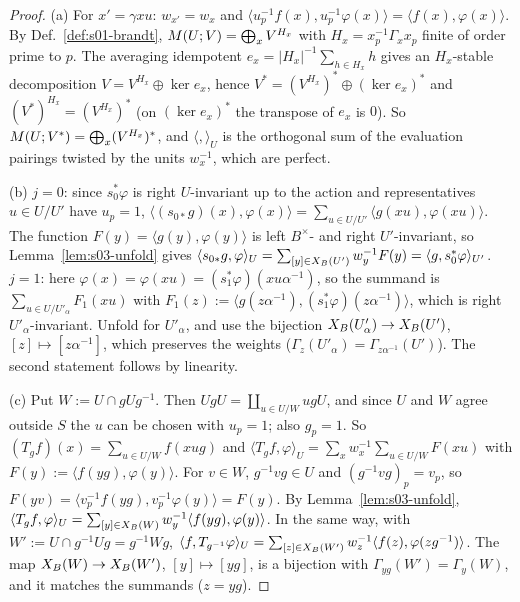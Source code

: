 \begin{proof}
(a) For $x'=\gamma xu$: $w_{x'}=w_x$ and $\langle u_p^{-1}f(x),u_p^{-1}\varphi(x)\rangle=\langle f(x),\varphi(x)\rangle$. By Def.~\ref{def:s01-brandt},
$M(U;V)=\bigoplus_xV^{H_x}$ with $H_x=x_p^{-1}\Gamma_xx_p$ finite of order prime to $p$. The averaging idempotent $e_x=|H_x|^{-1}\sum_{h\in H_x}h$ gives an
$H_x$-stable decomposition $V=V^{H_x}\oplus\ker e_x$, hence $V^*=(V^{H_x})^*\oplus(\ker e_x)^*$ and $(V^*)^{H_x}=(V^{H_x})^*$ (on $(\ker e_x)^*$ the
transpose of $e_x$ is $0$). So $M(U;V^*)=\bigoplus_x(V^{H_x})^*$, and $\langle,\rangle_U$ is the orthogonal sum of the evaluation pairings twisted by the
units $w_x^{-1}$, which are perfect.

(b) $j=0$: since $s_0^*\varphi$ is right $U$-invariant up to the action and representatives $u\in U/U'$ have $u_p=1$,
$\langle(s_{0*}g)(x),\varphi(x)\rangle=\sum_{u\in U/U'}\langle g(xu),\varphi(xu)\rangle$. The function $F(y)=\langle g(y),\varphi(y)\rangle$ is left $B^\times$- and right
$U'$-invariant, so Lemma~\ref{lem:s03-unfold} gives $\langle s_{0*}g,\varphi\rangle_U=\sum_{[y]\in X_B(U')}w_y^{-1}F(y)=\langle g,s_0^*\varphi\rangle_{U'}$. $j=1$: here
$\varphi(x)=\varphi(xu)=(s_1^*\varphi)(xu\alpha^{-1})$, so the summand is $\sum_{u\in U/U'_\alpha}F_1(xu)$ with $F_1(z):=\langle g(z\alpha^{-1}),(s_1^*\varphi)(z\alpha^{-1})\rangle$,
which is right $U'_\alpha$-invariant. Unfold for $U'_\alpha$, and use the bijection $X_B(U'_\alpha)\to X_B(U')$, $[z]\mapsto[z\alpha^{-1}]$, which preserves the
weights ($\Gamma_z(U'_\alpha)=\Gamma_{z\alpha^{-1}}(U')$). The second statement follows by linearity.

(c) Put $W:=U\cap gUg^{-1}$. Then $UgU=\coprod_{u\in U/W}ugU$, and since $U$ and $W$ agree outside $S$ the $u$ can be chosen with $u_p=1$; also
$g_p=1$. So $(T_gf)(x)=\sum_{u\in U/W}f(xug)$ and $\langle T_gf,\varphi\rangle_U=\sum_xw_x^{-1}\sum_{u\in U/W}F(xu)$ with $F(y):=\langle f(yg),\varphi(y)\rangle$. For
$v\in W$, $g^{-1}vg\in U$ and $(g^{-1}vg)_p=v_p$, so $F(yv)=\langle v_p^{-1}f(yg),v_p^{-1}\varphi(y)\rangle=F(y)$. By Lemma~\ref{lem:s03-unfold},
$\langle T_gf,\varphi\rangle_U=\sum_{[y]\in X_B(W)}w_y^{-1}\langle f(yg),\varphi(y)\rangle$. In the same way, with $W':=U\cap g^{-1}Ug=g^{-1}Wg$,
$\langle f,T_{g^{-1}}\varphi\rangle_U=\sum_{[z]\in X_B(W')}w_z^{-1}\langle f(z),\varphi(zg^{-1})\rangle$. The map $X_B(W)\to X_B(W')$, $[y]\mapsto[yg]$, is a bijection with
$\Gamma_{yg}(W')=\Gamma_y(W)$, and it matches the summands ($z=yg$).


\end{proof}
